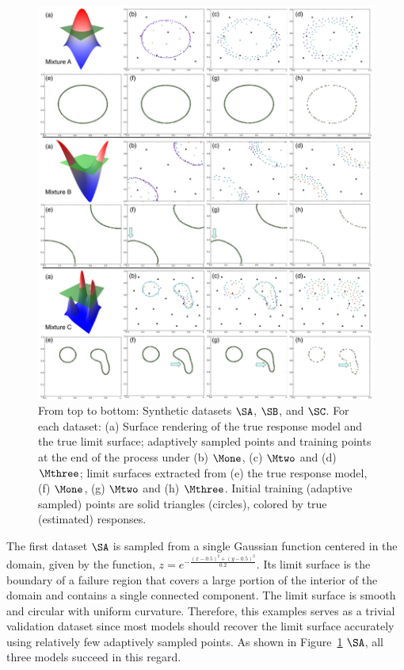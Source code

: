 \begin{figure}[!ht]
\centering
\includegraphics[width=1.0\textwidth]{figs/chap5/synthetic-A-B-C-GMM}
\caption{From top to bottom: Synthetic datasets $\protect\SA$, $\protect\SB$, and $\protect\SC$.
For each dataset: (a) Surface rendering of the true response model and the true limit surface; adaptively sampled points and training points at the end of the process under (b) $\protect\Mone$, (c) $\protect\Mtwo$ and (d) $\protect\Mthree$;
limit surfaces extracted from (e) the true response model, (f) $\protect\Mone$, (g) $\protect\Mtwo$ and (h) $\protect\Mthree$.
Initial training (adaptive sampled) points are solid triangles (circles), colored by true (estimated) responses.
}
\label{fig:synthetic-A-B-C-GMM}
\end{figure}

The first dataset $\SA$ is sampled from a single Gaussian function centered in the domain, given by the function, $z = e^{-\frac{(x-0.5)^2+(y-0.5)^2}{0.2}}$.
%
Its limit surface is the boundary of a failure region that covers a large portion of the interior of the domain and contains a single connected component.
%
The limit surface is smooth and circular with uniform curvature.
%
Therefore, this examples serves as a trivial validation dataset since most models should recover the limit surface accurately using relatively few adaptively sampled points.
%
As shown in Figure~\ref{fig:synthetic-A-B-C-GMM} $\SA$, all three models succeed in this regard.

